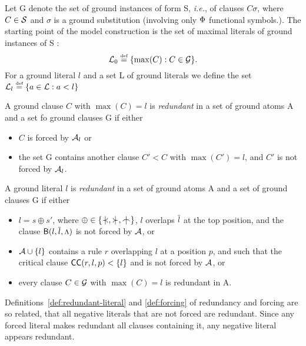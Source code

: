 
Let \C G denote the set of ground instances of form \C S, {\it i.e.}, of
clauses \(C\sigma\), where \(C\in \mbox {$\cal S$}\) and $\sigma$ is a ground
substitution (involving only $\Phi$ functional symbols.).  
The starting point of the model construction is the set of
maximal literals of ground instances of \C S :
\begin{equation} \label{eq:max-literals}
\mbox {$\cal L$}_0 \mathrel {\stackrel {\mbox {\tiny def}}{=}} \{\max(C) : C\in \mbox {$\cal G$}\}.
\end{equation}
%
For a ground literal $l$ and a set \C L of ground literals we define the set \(\mbox {$\cal L$}_l\mathrel {\stackrel {\mbox {\tiny def}}{=}} \{a\in\mbox {$\cal L$}:a<l\}\)
%
\begin{definition} \label{def:redundant-clause}
A ground clause \(C\) with \(\max(C)=l\) is {\em redundant} in a set of
ground atoms \C A and a set fo ground clauses \C G if either
\begin{itemize}\smallerspaces
\item $C$ is forced by \(\mbox {$\cal A$}_l\)  or 
\item the set \C G contains another clause \(C'<C\) with \(\max(C')=l\), and
\(C'\) is not forced by \(\mbox {$\cal A$}_l\).
\end{itemize}
\end{definition}

\begin{definition} \label{def:redundant-literal}
A ground literal $l$ is {\em redundant} in a set of ground atoms \C A and a
set of ground clauses \C G if either
\begin{itemize}\smallerspaces 
\item \(l=s\oplus s'\), where \(\oplus \in \{\notIncl ,\notCont ,\notInt\}\),
  $l$ overlaps \(\overline{l}\) at the top position, and the clause \({\sf B}(l,\overline{l},\mbox{\footnotesize$\Lambda$})\) is not forced by \(\mbox {$\cal A$}\), or
\item \(\mbox {$\cal A$}\cup\{l\}\) contains a rule $r$ overlapping $l$ at a position $p$,
  and such that the critical clause \({\sf CC}(r,l,p) <\{l\}\) and is not forced
  by \(\mbox {$\cal A$}\), or 
\item every clause $C\in \mbox {$\cal G$}$ with $\max(C)=l$ is redundant in \C A.
\end{itemize}
\end{definition}
\noindent
Definitions~\ref {def:redundant-literal} and \ref {def:forcing}
of redundancy and forcing are so related, that all negative literals that are
not forced are redundant. Since any forced literal makes redundant all
clauses containing it, any negative literal appears redundant.

